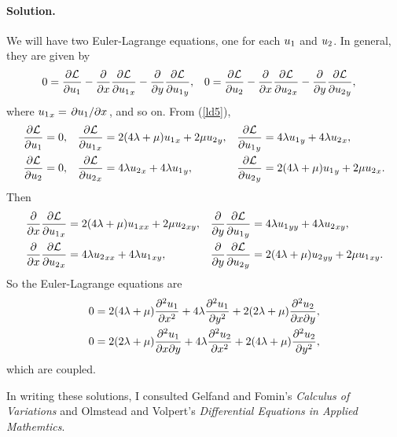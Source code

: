 \documentclass[11pt]{article}
\newcommand{\refeq}[1]{(\ref{#1})}
\newenvironment{solution}
{
    \paragraph{Solution.}
    \ignorespaces
}
{
}
\begin{document}
\begin{solution}
	We will have two Euler-Lagrange equations, one for each $u_1$ and $u_2$.  In general, they are given by
	\begin{align*}
		0 &= \pdv{\mathcal{L}}{u_1} - \pdv{}{x} \pdv{\mathcal{L}}{{u_1}_x} - \pdv{}{y} \pdv{\mathcal{L}}{{u_1}_y}, &
		0 &= \pdv{\mathcal{L}}{u_2} - \pdv{}{x} \pdv{\mathcal{L}}{{u_2}_x} - \pdv{}{y} \pdv{\mathcal{L}}{{u_2}_y},
	\end{align*}
	where ${u_1}_x = \pdv*{u_1}{x}$, and so on.  From \refeq{ld5},
	\begin{align*}
		\pdv{\mathcal{L}}{u_1} &= 0, &
		\pdv{\mathcal{L}}{{u_1}_x} &= 2 (4 \lambda + \mu) {u_1}_x + 2 \mu {u_2}_y, &
		\pdv{\mathcal{L}}{{u_1}_y} &= 4 \lambda {u_1}_y + 4 \lambda {u_2}_x, \\
		\pdv{\mathcal{L}}{u_2} &= 0, &
		\pdv{\mathcal{L}}{{u_2}_x} &= 4 \lambda {u_2}_x + 4 \lambda {u_1}_y, &
		\pdv{\mathcal{L}}{{u_2}_y} &= 2 (4 \lambda + \mu) {u_1}_y + 2 \mu {u_2}_x.
	\end{align*}
	Then
	\begin{align*}
		\pdv{}{x} \pdv{\mathcal{L}}{{u_1}_x} &= 2 (4 \lambda + \mu) {u_1}_{xx} + 2 \mu {u_2}_{xy}, &
		\pdv{}{y} \pdv{\mathcal{L}}{{u_1}_y} &= 4 \lambda {u_1}_{yy} + 4 \lambda {u_2}_{xy}, \\
		\pdv{}{x} \pdv{\mathcal{L}}{{u_2}_x} &= 4 \lambda {u_2}_{xx} + 4 \lambda {u_1}_{xy}, &
		\pdv{}{y} \pdv{\mathcal{L}}{{u_2}_y} &= 2 (4 \lambda + \mu) {u_2}_{yy} + 2 \mu {u_1}_{xy}.
	\end{align*}
	So the Euler-Lagrange equations are
	\begin{align*}
		0 &= 2 (4 \lambda + \mu) \pdv[2]{u_1}{x} + 4 \lambda \pdv[2]{u_1}{y} + 2 (2\lambda + \mu) \pdv{u_2}{x}{y}, \\
		0 &= 2 (2 \lambda + \mu) \pdv{u_1}{x}{y} + 4 \lambda \pdv[2]{u_2}{x} + 2 (4 \lambda + \mu) \pdv[2]{u_2}{y},
	\end{align*}
	which are coupled.
\end{solution}



In writing these solutions, I consulted Gelfand and Fomin's \emph{Calculus of Variations} and Olmstead and Volpert's \emph{Differential Equations in Applied Mathemtics}.
\end{document}
